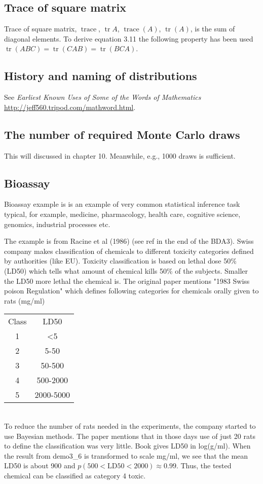 \documentclass[a4paper,11pt,english]{article}
\DeclareMathOperator{\tr}{tr}
\DeclareMathOperator{\trace}{trace}
\begin{document}
\subsection*{Trace of square matrix}

Trace of square matrix, $\trace$, $\tr A$, $\trace(A)$, $\tr(A)$, is
the sum of diagonal elements. To derive equation 3.11 the following
property has been used $\tr(ABC) = \tr(CAB) = \tr(BCA)$.

\subsection*{History and naming of distributions}

See \emph{Earliest Known Uses of Some of the Words of Mathematics}
\url{http://jeff560.tripod.com/mathword.html}.

\subsection*{The number of  required Monte Carlo draws}

This will discussed in chapter 10. Meanwhile, e.g., 1000 draws is sufficient.

\subsection*{Bioassay}

Bioassay example is is an example of very common statistical inference
task typical, for example, medicine, pharmacology, health care,
cognitive science, genomics, industrial processes etc.

The example is from Racine et al (1986) (see ref in the end of the
BDA3). Swiss company makes classification of chemicals to different
toxicity categories defined by authorities (like EU). Toxicity
classification is based on lethal dose 50\% (LD50) which tells what
amount of chemical kills 50\% of the subjects. Smaller the LD50 more
lethal the chemical is. The original paper mentions "1983 Swiss poison
Regulation" which defines following categories for chemicals orally
given to rats (mg/ml)\\
\begin{tabular}{c c}
Class & LD50 \\
1 & <5 \\
     2  &         5-50 \\
     3  &        50-500 \\
     4  &       500-2000 \\
     5  &      2000-5000 
\end{tabular}\\
To reduce the number of rats needed in the experiments, the company
started to use Bayesian methods. The paper mentions that in those days
use of just 20 rats to define the classification was very little.
%
Book gives LD50 in log(g/ml). When the result from demo3\_6 is
transformed to scale mg/ml, we see that the mean LD50 is about 900 and
$p(500<\text{LD50}<2000)\approx 0.99$. Thus, the tested chemical can be
classified as category 4 toxic.
\end{document}
